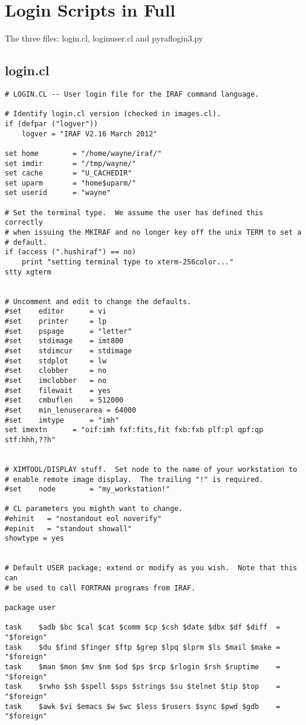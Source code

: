 \section{Login Scripts in Full} \label{sec:LoginScriptsInFull}

The three files: login.cl, loginuser.cl and pyraflogin3.py

\subsection{login.cl}

{\color{darkred}
\begingroup \fontsize{10pt}{10pt}
\selectfont
\begin{verbatim} 
# LOGIN.CL -- User login file for the IRAF command language.

# Identify login.cl version (checked in images.cl).
if (defpar ("logver"))
    logver = "IRAF V2.16 March 2012"

set	home		= "/home/wayne/iraf/"
set	imdir		= "/tmp/wayne/"
set	cache		= "U_CACHEDIR"
set	uparm		= "home$uparm/"
set	userid		= "wayne"

# Set the terminal type.  We assume the user has defined this correctly 
# when issuing the MKIRAF and no longer key off the unix TERM to set a
# default.
if (access (".hushiraf") == no)
    print "setting terminal type to xterm-256color..."
stty xgterm


# Uncomment and edit to change the defaults.
#set	editor		= vi
#set	printer		= lp
#set	pspage		= "letter"
#set	stdimage	= imt800
#set	stdimcur	= stdimage
#set	stdplot		= lw
#set	clobber		= no
#set	imclobber	= no
#set	filewait	= yes
#set	cmbuflen	= 512000
#set	min_lenuserarea	= 64000
#set	imtype		= "imh"
set	imextn		= "oif:imh fxf:fits,fit fxb:fxb plf:pl qpf:qp stf:hhh,??h"


# XIMTOOL/DISPLAY stuff.  Set node to the name of your workstation to
# enable remote image display.  The trailing "!" is required.
#set	node		= "my_workstation!"

# CL parameters you mighth want to change.
#ehinit   = "nostandout eol noverify"
#epinit   = "standout showall"
showtype = yes


# Default USER package; extend or modify as you wish.  Note that this can
# be used to call FORTRAN programs from IRAF.

package user

task	$adb $bc $cal $cat $comm $cp $csh $date $dbx $df $diff	= "$foreign"
task	$du $find $finger $ftp $grep $lpq $lprm $ls $mail $make	= "$foreign"
task	$man $mon $mv $nm $od $ps $rcp $rlogin $rsh $ruptime	= "$foreign"
task	$rwho $sh $spell $sps $strings $su $telnet $tip $top	= "$foreign"
task	$awk $vi $emacs $w $wc $less $rusers $sync $pwd $gdb	= "$foreign"


\end{verbatim}}
